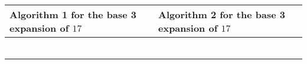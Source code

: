 \begin{center}
\begin{tabular}{p{3.3in}|p{3.3in}}
Algorithm 1 for the base 3 expansion of $17$ &Algorithm 2 for the base 3 expansion of $17$  \\
\hline
 & \\
 & \\
 & \\
 & \\
  & \\
 & \\
\end{tabular}
\end{center}

\vfill
